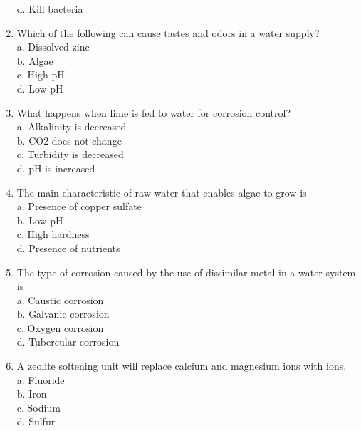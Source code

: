 \begin{enumerate}
d. Kill bacteria\\


\item Which of the following can cause tastes and odors in a water supply?\\
a. Dissolved zinc\\
b. Algae\\
c.  High pH\\
d.  Low pH\\

\item What happens when lime is fed to water for corrosion control?\\


a. Alkalinity is decreased\\

b. CO2 does not change\\

c. Turbidity is decreased\\

d.  pH is increased\\

\item The main characteristic of raw water that enables algae to grow is\\

a. Presence of copper sulfate\\

b. Low pH\\

c. High hardness\\

d. Presence of nutrients\\


\item The type of corrosion caused by the use of dissimilar metal in a water system is\\

a. Caustic corrosion\\

b. Galvanic corrosion\\

c. Oxygen corrosion\\

d. Tubercular corrosion\\

  \item A zeolite softening unit will replace calcium and magnesium ions with ions.\\
a. Fluoride\\
b. Iron\\
c. Sodium\\
d. Sulfur\\


\end{enumerate}
